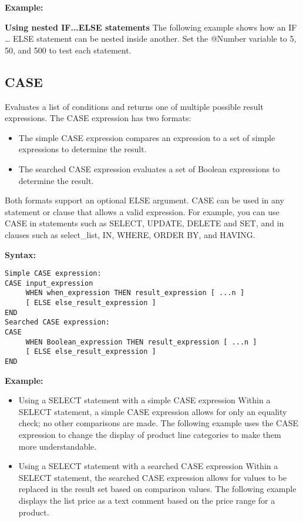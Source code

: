 \textbf{Example:}\newline


\textbf{Using nested IF...ELSE statements}\newline
The following example shows how an IF … ELSE statement can be nested inside another. Set the @Number variable to 5, 50, and 500 to test each statement.


\subsection{CASE}
Evaluates a list of conditions and returns one of multiple possible result expressions. 
The CASE expression has two formats:
\begin{itemize}
\item The simple CASE expression compares an expression to a set of simple expressions to determine the result.
\item The searched CASE expression evaluates a set of Boolean expressions to determine the result.
\end{itemize}

Both formats support an optional ELSE argument.
CASE can be used in any statement or clause that allows a valid expression. For example, you can use CASE in statements such as SELECT, UPDATE, DELETE and SET, and in clauses such as select\_list, IN, WHERE, ORDER BY, and HAVING.

\textbf{Syntax:}
\begin{verbatim}
Simple CASE expression:   
CASE input_expression   
     WHEN when_expression THEN result_expression [ ...n ]   
     [ ELSE else_result_expression ]   
END   
Searched CASE expression:  
CASE  
     WHEN Boolean_expression THEN result_expression [ ...n ]   
     [ ELSE else_result_expression ]   
END  
\end{verbatim}

\textbf{Example:}\newline
\begin{itemize}
\item Using a SELECT statement with a simple CASE expression
Within a SELECT statement, a simple CASE expression allows for only an equality check; no other comparisons are made. The following example uses the CASE expression to change the display of product line categories to make them more understandable.

\item Using a SELECT statement with a searched CASE expression
Within a SELECT statement, the searched CASE expression allows for values to be replaced in the result set based on comparison values. The following example displays the list price as a text comment based on the price range for a product.

\end{itemize}

